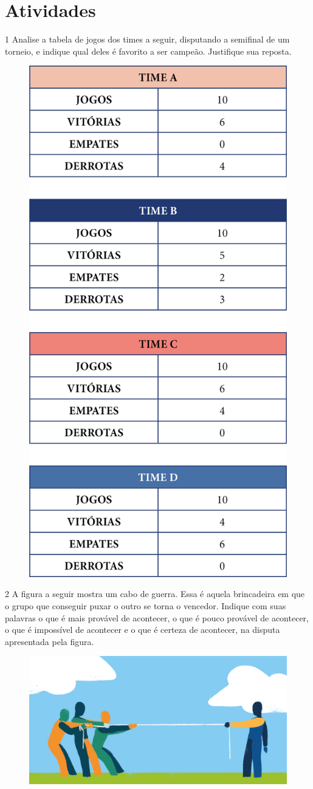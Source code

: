 \section*{Atividades}

\num{1} Analise a tabela de jogos dos times a seguir, disputando a semifinal de um
torneio, e indique qual deles é favorito a ser campeão. Justifique sua reposta.

\begin{figure}[htpb!]
\centering
\includegraphics[width=.4\textwidth]{./media/image85.png}
\end{figure}

\num{2} A figura a seguir mostra um cabo de guerra. Essa é aquela brincadeira em
que o grupo que conseguir puxar o outro se torna o vencedor. Indique com
suas palavras o que é mais provável de acontecer, o que é pouco provável
de acontecer, o que é impossível de acontecer e o que é certeza de
acontecer, na disputa apresentada pela figura.


\begin{figure}[htpb!]
\includegraphics[width=\textwidth]{./media/image86.png}
\end{figure}

